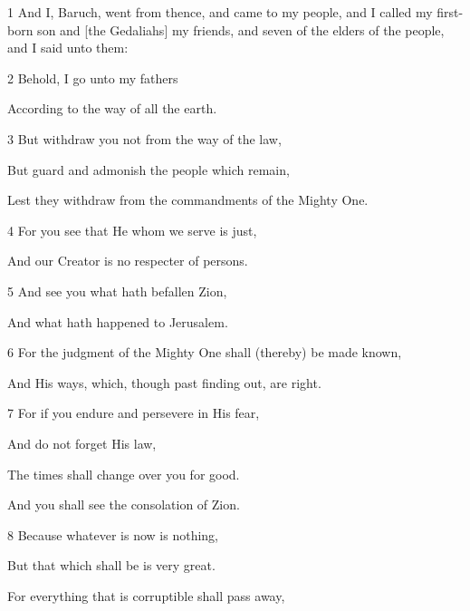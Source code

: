 \par 1 And I, Baruch, went from thence, and came to my people, and I called my first-born son and [the Gedaliahs] my friends, and seven of the elders of the people, and I said unto them:

\par 2 Behold, I go unto my fathers

\par According to the way of all the earth.

\par 3 But withdraw you not from the way of the law,

\par But guard and admonish the people which remain,

\par Lest they withdraw from the commandments of the Mighty One.

\par 4 For you see that He whom we serve is just,

\par And our Creator is no respecter of persons.

\par 5 And see you what hath befallen Zion,

\par And what hath happened to Jerusalem.

\par 6 For the judgment of the Mighty One shall (thereby) be made known,

\par And His ways, which, though past finding out, are right.

\par 7 For if you endure and persevere in His fear,

\par And do not forget His law,

\par The times shall change over you for good.

\par And you shall see the consolation of Zion.

\par 8 Because whatever is now is nothing,

\par But that which shall be is very great.

\par For everything that is corruptible shall pass away,

